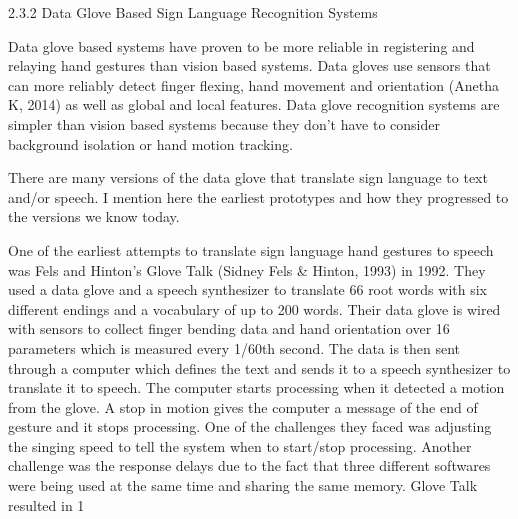2.3.2 Data Glove Based Sign Language Recognition Systems 

Data glove based systems have proven to be more reliable in registering and relaying hand gestures than vision based systems. Data gloves use sensors that can more reliably detect finger flexing, hand movement and orientation (Anetha K, 2014) as well as global and local features. Data glove recognition systems are simpler than vision based systems because they don’t have to consider background isolation or hand motion tracking. 

There are many versions of the data glove that translate sign language to text and/or speech. I mention here the earliest prototypes and how they progressed to the versions we know today. 

One of the earliest attempts to translate sign language hand gestures to speech was Fels and Hinton’s Glove Talk (Sidney Fels & Hinton, 1993) in 1992. They used a data glove and a speech synthesizer to translate 66 root words with six different endings and a vocabulary of up to 200 words. 
Their data glove is wired with sensors to collect finger bending data and hand orientation over 16 parameters which is measured every 1/60th second. The data is then sent through a computer which defines the text and sends it to a speech synthesizer to translate it to speech. The computer starts processing when it detected a motion from the glove. A stop in motion gives the computer a message of the end of gesture and it stops processing. One of the challenges they faced was adjusting the singing speed to tell the system when to start/stop processing. Another challenge was the response delays due to the fact that three different softwares were being used at the same time and sharing the same memory. Glove Talk resulted in 1%

